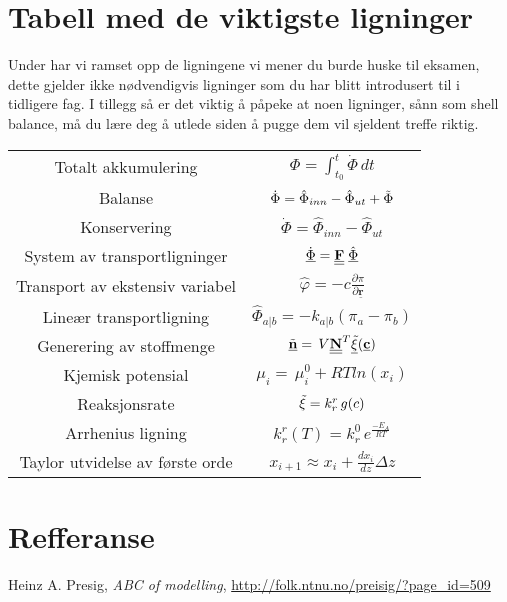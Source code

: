 \clearpage
\section{Tabell med de viktigste ligninger}
Under har vi ramset opp de ligningene vi mener du burde huske til eksamen, dette gjelder ikke nødvendigvis ligninger som du har blitt introdusert til i tidligere fag. I tillegg så er det viktig å påpeke at noen ligninger, sånn som shell balance, må du lære deg å utlede siden å pugge dem vil sjeldent treffe riktig. 
\begin{table}[H]
    \centering
    \begin{tabular}{c|c}
        Totalt akkumulering & $\Phi = \int_{t_0}^{t}\dot{\Phi}\,dt $  \\[0.2cm]
         Balanse  & $\dot{\Phi} = \hat{\Phi}_{inn} - \hat{\Phi}_{ut} + \Tilde{\Phi}$ \\[0.2cm]
         Konservering & $\dot{\Phi} = \hat{\Phi}_{inn} - \hat{\Phi}_{ut} $\\[0.2cm]
         System av transportligninger & $\underline{\dot{\Phi}} = \textbf{\underline{\underline{F}}}\hspace{0.1cm}\underline{\hat{\Phi}}$ \\[0.2cm]
         Transport av ekstensiv variabel & $\hat{\varphi} = -c\frac{\partial \pi}{\partial \underline{\textbf{r}}}$ \\[0.2cm]
         Lineær transportligning & $\hat{\Phi}_{a|b} = -k_{a|b}(\pi_a-\pi_b)$ \\[0.2cm] 
         Generering av stoffmenge & $\underline{\Tilde{\textbf{n}}}=\,V\underline{\underline{\textbf{N}}}^T\underline{\Tilde{\xi}}(\underline{\textbf{c}})$ \\[0.2cm]
         Kjemisk potensial & $\mu_i =\, \mu_{i}^0 + RTln(x_i)$ \\[0.2cm]
         Reaksjonsrate & $\Tilde{\xi} = k^r_r\,g(c)$ \\[0.2cm] 
         Arrhenius ligning & $k^r_r(T) =k^0_r\,e^{\frac{-E_{A}}{RT}}$ \\[0.2cm]
         
         Taylor utvidelse av første orde & $x_{i+1} \approx x_i + \frac{dx_i}{dz}\Delta z$ \\[0.2cm]
    \end{tabular}
    \label{tab:my_label}
\end{table}

\appendix
\section{Refferanse}
Heinz A. Presig, \textit{ABC of modelling}, \url{http://folk.ntnu.no/preisig/?page_id=509}